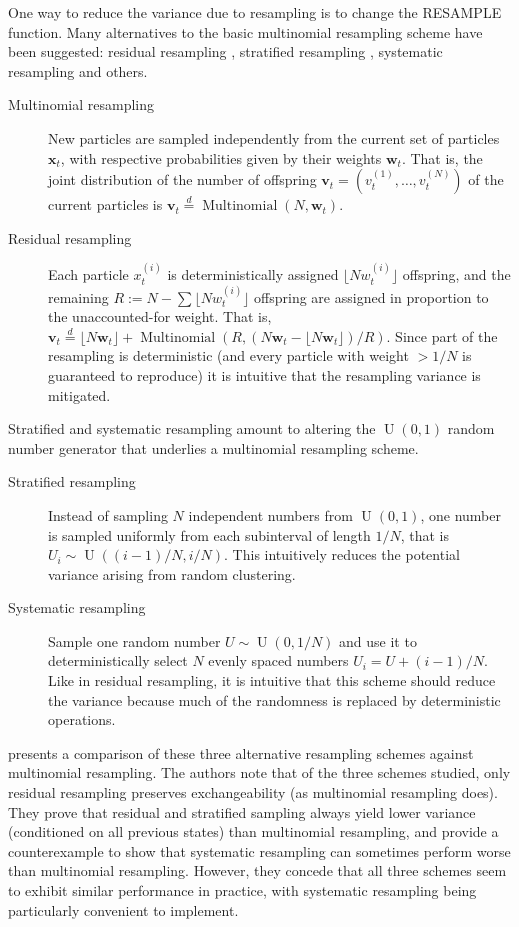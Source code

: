 \documentclass{article}
\newcommand{\eqdist}{\overset{d}{=}}
\begin{document}
One way to reduce the variance due to resampling is to change the {\footnotesize RESAMPLE} function.
Many alternatives to the basic multinomial resampling scheme have been suggested: residual resampling \citep{liu1998}, stratified resampling \citep{kitagawa1996}, systematic resampling \citep{carpenter1999} and others.

\begin{description}
\item[Multinomial resampling] New particles are sampled independently from the current set of particles $\mathbf{x}_{t}$, with respective probabilities given by their weights $\mathbf{w}_{t}$. That is, the joint distribution of the number of offspring $\mathbf{v}_{t} = (v_{t}^{(1)},\dots,v_{t}^{(N)})$ of the current particles is $\mathbf{v}_{t} \eqdist \operatorname{Multinomial}(N, \mathbf{w}_{t})$.
\item[Residual resampling] Each particle $x_{t}^{(i)}$ is deterministically assigned $\lfloor N w_{t}^{(i)} \rfloor$ offspring, and the remaining $R := N- \sum \lfloor N w_{t}^{(i)} \rfloor$ offspring are assigned in proportion to the unaccounted-for weight. That is, $\mathbf{v}_{t} \eqdist \lfloor N \mathbf{w}_{t} \rfloor +  \operatorname{Multinomial}(R, (N \mathbf{w}_{t} - \lfloor N \mathbf{w}_{t} \rfloor)/R)$. Since part of the resampling is deterministic (and every particle with weight $>1/N$ is guaranteed to reproduce) it is intuitive that the resampling variance is mitigated.
\end{description}
Stratified and systematic resampling amount to altering the $\operatorname{U}(0,1)$ random number generator that underlies a multinomial resampling scheme.
\begin{description}
\item[Stratified resampling] Instead of sampling $N$ independent numbers from $\operatorname{U}(0,1)$, one number is sampled uniformly from each subinterval of length $1/N$, that is $U_i \sim \operatorname{U}((i-1)/N, i/N)$. This intuitively reduces the potential variance arising from random clustering.
\item[Systematic resampling] Sample one random number $U \sim \operatorname{U}(0,1/N)$ and use it to deterministically select $N$ evenly spaced numbers $U_i = U + (i-1)/N$. Like in residual resampling, it is intuitive that this scheme should reduce the variance because much of the randomness is replaced by deterministic operations.
\end{description}


\citet{douc2005} presents a comparison of these three alternative resampling schemes against multinomial resampling. The authors note that of the three schemes studied, only residual resampling preserves exchangeability (as multinomial resampling does). They prove that residual and stratified sampling always yield lower variance (conditioned on all previous states) than multinomial resampling, and provide a counterexample to show that systematic resampling can sometimes perform worse than multinomial resampling. However, they concede that all three schemes seem to exhibit similar performance in practice, with systematic resampling being particularly convenient to implement.
\end{document}
